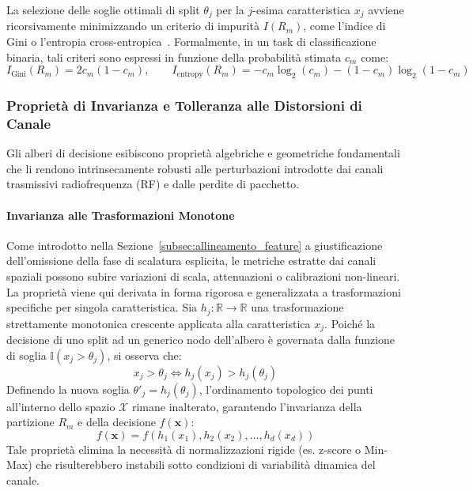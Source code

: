 La selezione delle soglie ottimali di split $\theta_j$ per la $j$-esima caratteristica $x_j$ avviene ricorsivamente minimizzando un criterio di impurità $I(R_m)$, come l'indice di Gini o l'entropia cross-entropica~\cite{breiman1984}. Formalmente, in un task di classificazione binaria, tali criteri sono espressi in funzione della probabilità stimata $c_m$ come:
\begin{equation}
    I_{\text{Gini}}(R_m) = 2c_m(1-c_m), \qquad I_{\text{entropy}}(R_m) = -c_m\log_2(c_m) - (1-c_m)\log_2(1-c_m)
\end{equation}

\subsubsection{Proprietà di Invarianza e Tolleranza alle Distorsioni di Canale}
Gli alberi di decisione esibiscono proprietà algebriche e geometriche fondamentali che li rendono intrinsecamente robusti alle perturbazioni introdotte dai canali trasmissivi radiofrequenza (RF) e dalle perdite di pacchetto.

\paragraph{Invarianza alle Trasformazioni Monotone}
Come introdotto nella Sezione~\ref{subsec:allineamento_feature} a giustificazione dell'omissione della fase di scalatura esplicita, le metriche estratte dai canali spaziali possono subire variazioni di scala, attenuazioni o calibrazioni non-lineari. La proprietà viene qui derivata in forma rigorosa e generalizzata a trasformazioni specifiche per singola caratteristica. Sia $h_j: \mathbb{R} \to \mathbb{R}$ una trasformazione strettamente monotonica crescente applicata alla caratteristica $x_j$. Poiché la decisione di uno split ad un generico nodo dell'albero è governata dalla funzione di soglia $\mathbb{I}(x_j > \theta_j)$, si osserva che:
\begin{equation}
    x_j > \theta_j \iff h_j(x_j) > h_j(\theta_j)
\end{equation}
Definendo la nuova soglia $\theta'_j = h_j(\theta_j)$, l'ordinamento topologico dei punti all'interno dello spazio $\mathcal{X}$ rimane inalterato, garantendo l'invarianza della partizione $R_m$ e della decisione $f(\mathbf{x})$:
\begin{equation}
    f(\mathbf{x}) = f(h_1(x_1), h_2(x_2), \dots, h_d(x_d))
\end{equation}
Tale proprietà elimina la necessità di normalizzazioni rigide (es. z-score o Min-Max) che risulterebbero instabili sotto condizioni di variabilità dinamica del canale.

